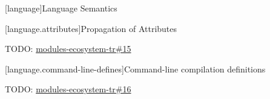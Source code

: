
[language]{Language Semantics}

%

[language.attributes]{Propagation of Attributes}

\pnum TODO: \href{https://github.com/cplusplus/modules-ecosystem-tr/issues/15}{modules-ecosystem-tr\#15}

[language.command-line-defines]{Command-line compilation definitions}

\pnum TODO: \href{https://github.com/cplusplus/modules-ecosystem-tr/issues/16}{modules-ecosystem-tr\#16}

%

